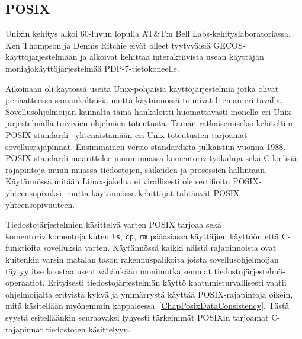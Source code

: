 \subsection{POSIX}

Unixin kehitys alkoi 60-luvun lopulla AT\&T:n Bell Labs-kehityslaboratoriassa.
Ken Thompson ja Dennis Ritchie eivät olleet tyytyväisiä GECOS-käyttöjärjestelmään
ja alkoivat kehittää interaktiivista usean käyttäjän moniajokäyttöjärjestelmää PDP-7-tietokoneelle.

Aikoinaan oli käytössä useita Unix-pohjaisia käyttöjärjestelmiä jotka olivat periaatteessa samankaltaisia mutta käytännössä toimivat hieman eri tavalla.
Sovellusohjelmoijan kannalta tämä hankaloitti huomattavasti monella eri Unix-järjestelmällä toivivien ohjelmien toteutusta.
Tämän ratkaisemiseksi kehiteltiin POSIX-standardi~\cite{PosixSpec} yhtenäistämään eri Unix-toteutusten tarjoamat sovellusrajapinnat.
Ensimmäinen versio standardista julkaistiin vuonna 1988.
POSIX-standardi määrittelee muun muassa komentorivityökaluja sekä C-kielisiä rajapintoja muun muassa tiedostojen, säikeiden ja prosessien hallintaan.
Käytännössä mitään Linux-jakelua ei virallisesti ole sertifioitu POSIX-yhteensopivaksi,
mutta käytännössä kehittäjät tähtäävät POSIX-yhteensopivuuteen.

Tiedostojärjestelmien käsittelyä varten POSIX tarjoaa sekä komentorivikomentoja kuten \texttt{ls}, \texttt{cp}, \texttt{rm} pääasiassa käyttäjien käyttöön että C-funktioita sovelluksia varten.
Käytännössä kaikki näistä rajapinnoista ovat kuitenkin varsin matalan tason rakennuspalikoita joista sovellusohjelmoijan täytyy itse koostaa useat vähänkään monimutkaisemmat tiedostojärjestelmä-operaatiot.
Erityisesti tiedostojärjestelmän käyttö kaatumisturvallisesti vaatii ohjelmoijalta erityistä kykyä ja ymmärrystä käyttää POSIX-rajapintoja oikein,
mitä käsitellään myöhemmin kappaleessa~\ref{ChapPosixDataConsistency}.
Tästä syystä esitelläänkin seuraavaksi lyhyesti tärkeimmät POSIXin tarjoamat C-rajapinnat tiedostojen käsittelyyn.

